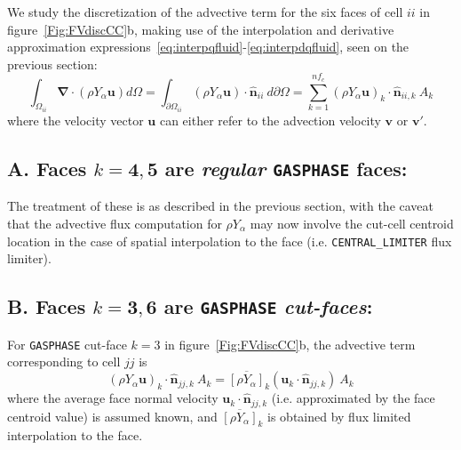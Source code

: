 We study the discretization of the advective term for the six faces of cell $ii$ in figure~\ref{Fig:FVdiscCC}b, making use of the interpolation and derivative approximation expressions~\eqref{eq:interpqfluid}-\eqref{eq:interpdqfluid}, seen on the previous section:
%
\begin{equation}
  \int_{\Omega_{ii}} { \boldsymbol{\nabla} \cdot  \left(  \rho Y_\alpha \mathbf{u} \right) } d \Omega =
  \int_{\partial \Omega_{ii}} { \left( \rho Y_\alpha \mathbf{u} \right) \cdot \hat{\mathbf{n}}_{ii} } \: d \partial \Omega =
  \sum^{nf_c}_{k=1} \left( \rho Y_\alpha \mathbf{u} \right)_k \cdot \hat{\mathbf{n}}_{ii,k} \: A_k \label{eq:fvadv}
\end{equation}
%
where the velocity vector $\mathbf{u}$ can either refer to the advection velocity $\mathbf{v}$ or $\mathbf{v}'$.

\subsection*{A. Faces $k=\mathbf{4},\mathbf{5}$ are \textit{regular} \texttt{GASPHASE} faces:}
The treatment of these is as described in the previous section, with the caveat that the advective flux computation for $\rho Y_\alpha$ may now involve the cut-cell centroid location in the case of spatial interpolation to the face (i.e. \texttt{CENTRAL\_LIMITER} flux limiter).

\subsection*{B. Faces $k=\mathbf{3},\mathbf{6}$ are \texttt{GASPHASE} \textit{cut-faces}:}

For \texttt{GASPHASE} cut-face $k=3$ in figure~\ref{Fig:FVdiscCC}b, the advective term corresponding to cell $jj$ is
%
\begin{equation}
  \left( \rho Y_\alpha \mathbf{u} \right)_k \cdot \hat{\mathbf{n}}_{jj,k} \: A_k = \overline{[\rho Y_\alpha]}_k \left( \mathbf{u}_k \cdot \hat{\mathbf{n}}_{jj,k} \right) \: A_k \label{eq:convgcutface}
\end{equation}
%
where the average face normal velocity $\mathbf{u}_k \cdot \hat{\mathbf{n}}_{jj,k} $ (i.e. approximated by the face centroid value) is assumed known, and $\overline{[\rho Y_\alpha]}_k$ is obtained by flux limited interpolation to the face.

